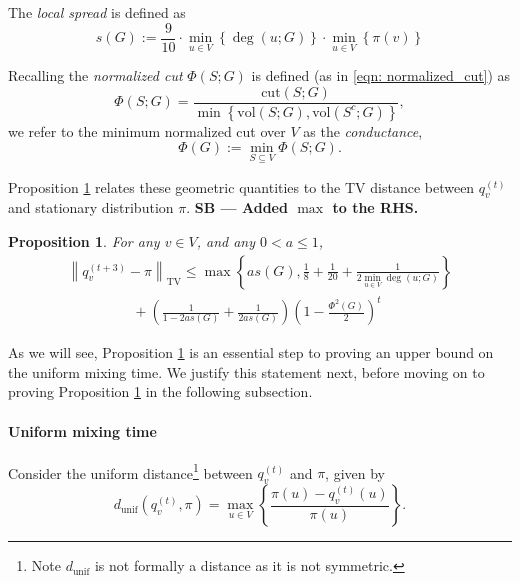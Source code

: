 \documentclass[11pt,twoside]{article}
\newtheorem{proposition}{Proposition}
\newcommand{\set}[1]{\left\{#1\right\}}
\newcommand{\vol}{\mathrm{vol}}
\newcommand{\cut}{\mathrm{cut}}
\newcommand{\norm}[1]{\left\lVert#1\right\rVert}
\newcommand{\1}{\mathbf{1}}
\newcommand{\sbcomment}[1]{{\color{red} \bf{{{{SB --- #1}}}}}}
\begin{document}
The \emph{local spread} is defined as
\begin{equation*}
s(G) := \frac{9}{10} \cdot \min_{u \in V} \set{\deg(u; G)} \cdot \min_{u \in V} \set{\pi(v)}
\end{equation*}

Recalling the \emph{normalized cut} $\Phi(S;G)$ is defined (as in \eqref{eqn: normalized_cut}) as
\begin{equation*}
\Phi(S;G) = \frac{\cut(S; G)}{\min\set{\vol(S; G),\vol(S^c; G)}},
\end{equation*}
we refer to the minimum normalized cut over $V$ as the \emph{conductance},
\begin{equation*}
\Phi(G) := \min_{S \subseteq V} \Phi(S;G).
\end{equation*}

Proposition \ref{prop: tv_mixing_time} relates these geometric quantities to the TV distance between $q_v^{(t)}$ and stationary distribution $\pi$.
\sbcomment{Added $\max$ to the RHS.}
\begin{proposition}
	\label{prop: tv_mixing_time}
	For any $v \in V$, and any $0 < a \leq 1$,
	\begin{align*}
	\norm{q_v^{(t + 3)} - \pi}_{\mathrm{TV}} \leq \max\set{as(G), \frac{1}{8} + \frac{1}{20} + \frac{1}{2 \min_{u \in V} \deg(u;G)}} 
	 \\
	~~~~~~~~~~~~~~~~~~~~~ + \left(\frac{1}{1 - 2as(G)} +  \frac{1}{2 as(G)}\right) \left(1 - \frac{\Phi^2(G)}{2}\right)^t
	\end{align*}
\end{proposition}

As we will see, Proposition \ref{prop: tv_mixing_time} is an essential step to proving an upper bound on the uniform mixing time. We justify this statement next, before moving on to proving Proposition \ref{prop: tv_mixing_time} in the following subsection.

\paragraph{Uniform mixing time}
Consider the uniform distance\footnote{Note $d_{\textrm{unif}}$ is not formally a distance as it is not symmetric.} between $q_v^{(t)}$ and $\pi$, given by
\begin{equation*}
d_{\textrm{unif}}(q_v^{(t)},\pi) = \max_{u \in V} \set{\frac{\pi(u) - q_v^{(t)}(u)}{\pi(u)}}.
\end{equation*}
\end{document}
